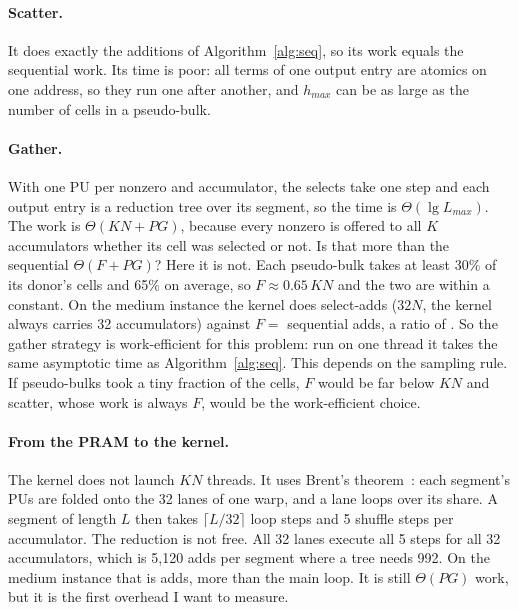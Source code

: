 \documentclass[sigconf,nonacm]{acmart}
\begin{document}
\paragraph{Scatter.} It does exactly the additions of Algorithm~\ref{alg:seq}, so its work equals
the sequential work. Its time is poor: all terms of one output entry are atomics on one address, so
they run one after another, and $h_{max}$ can be as large as the number of cells in a pseudo-bulk.

\paragraph{Gather.} With one PU per nonzero and accumulator, the selects take one step and each
output entry is a reduction tree over its segment, so the time is $\Theta(\lg L_{max})$. The work is
$\Theta(KN + PG)$, because every nonzero is offered to all $K$ accumulators whether its cell was
selected or not. Is that more than the sequential $\Theta(F + PG)$? Here it is not. Each pseudo-bulk
takes at least 30\% of its donor's cells and 65\% on average, so $F \approx 0.65\,KN$ and the two
are within a constant. On the medium instance the kernel does \GatherAddsMedium{} select-adds
($32N$, the kernel always carries 32 accumulators) against $F = $ \TermsMedium{} sequential adds, a
ratio of \WorkRatioMedium{}. So the gather strategy is work-efficient for this problem: run on one
thread it takes the same asymptotic time as Algorithm~\ref{alg:seq}. This depends on the sampling
rule. If pseudo-bulks took a tiny fraction of the cells, $F$ would be far below $KN$ and scatter,
whose work is always $F$, would be the work-efficient choice.

\paragraph{From the PRAM to the kernel.} The kernel does not launch $KN$ threads. It uses Brent's
theorem~\cite{brent1974}: each segment's PUs are folded onto the 32 lanes of one warp, and a lane
loops over its share. A segment of length $L$ then takes $\lceil L/32 \rceil$ loop steps and 5
shuffle steps per accumulator. The reduction is not free. All 32 lanes execute all 5 steps for all
32 accumulators, which is 5,120 adds per segment where a tree needs 992. On the medium instance that
is \ShuffleAddsMedium{} adds, more than the main loop. It is still $\Theta(PG)$ work, but it is the
first overhead I want to measure.
\end{document}
